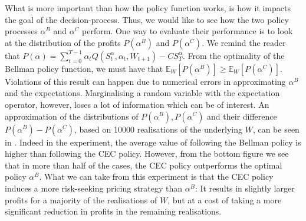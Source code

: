 \documentclass[main.tex]{subfiles}
\begin{document}
What is more important than how the policy function works, is how it
impacts the goal of the decision-process. Thus, we would like to see
how the two policy processes $\alpha^B$ and $\alpha^C$ perform.
One way to evaluate their performance is to look at
the distribution of the profits $P(\alpha^B)$ and $P(\alpha^C)$.
We remind the reader that
$P(\alpha) =
\sum_{t=0}^{T-1}\alpha_tQ(S_t^\alpha,\alpha_t,W_{t+1})-CS_T^\alpha$.
From the optimality of the Bellman policy function, we must have
that $\mathbb E_W[P(\alpha^B)]\geq \mathbb
E_W[P(\alpha^C)]$. Violations of this result can happen due to
numerical errors in approximating $\alpha^B$ and the expectations.
Marginalising a random variable with the expectation operator, however,
loses a lot of information which can be of interest.
An approximation of the distributions of $P(\alpha^B), P(\alpha^C)$
and their difference
$P(\alpha^B)-P(\alpha^C)$, based on \num{10000} realisations of the
underlying $W$, can be seen in .
Indeed in the experiment, the average value of following the
Bellman policy is higher than following the CEC policy.
However, from the bottom figure we see that
in more than half of the cases, the CEC policy outperforms the optimal
policy $\alpha^B$. What we can take from this experiment is that
the CEC policy induces a more risk-seeking pricing strategy than
$\alpha^B$: It results in slightly larger profits for a majority of the
realisations of $W$, but at a cost of taking a more significant
reduction in
profits in the remaining realisations.
\end{document}
